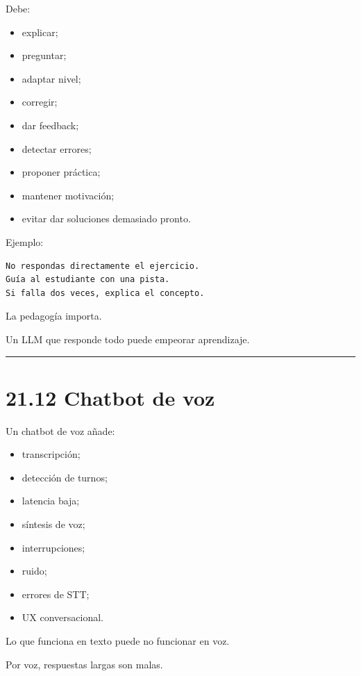 Debe:

\begin{itemize}
\tightlist
\item
  explicar;
\item
  preguntar;
\item
  adaptar nivel;
\item
  corregir;
\item
  dar feedback;
\item
  detectar errores;
\item
  proponer práctica;
\item
  mantener motivación;
\item
  evitar dar soluciones demasiado pronto.
\end{itemize}

Ejemplo:

\begin{lstlisting}
No respondas directamente el ejercicio.
Guía al estudiante con una pista.
Si falla dos veces, explica el concepto.
\end{lstlisting}

La pedagogía importa.

Un LLM que responde todo puede empeorar aprendizaje.

\begin{center}\rule{0.5\linewidth}{0.5pt}\end{center}

\section{21.12 Chatbot de voz}\label{chatbot-de-voz-1}

Un chatbot de voz añade:

\begin{itemize}
\tightlist
\item
  transcripción;
\item
  detección de turnos;
\item
  latencia baja;
\item
  síntesis de voz;
\item
  interrupciones;
\item
  ruido;
\item
  errores de STT;
\item
  UX conversacional.
\end{itemize}

Lo que funciona en texto puede no funcionar en voz.

Por voz, respuestas largas son malas.

